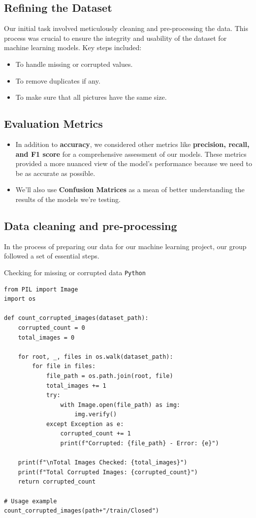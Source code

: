 \documentclass{modeleRapport}
\begin{document}
\subsection{Refining the Dataset}
Our initial task involved meticulously cleaning and pre-processing the data. This process was crucial to ensure the integrity and usability of the dataset for machine learning models. Key steps included: 
\begin{itemize}
    \item To handle missing or corrupted values.
    \item To remove duplicates if any.
    \item To make sure that all pictures have the same size.
\end{itemize}

\subsection{Evaluation Metrics}

\begin{itemize}
    \item In addition to \textbf{accuracy}, we considered other metrics like \textbf{precision, recall, and F1 score} for a comprehensive assessment of our models. These metrics provided a more nuanced view of the model's performance because we need to be as accurate as possible. 
    \item We'll also use \textbf{Confusion Matrices} as a mean of better understanding the results of the models we're testing.
\end{itemize}

\subsection{Data cleaning and pre-processing}

In the process of preparing our data for our machine learning project, our group followed a set of essential steps.

\begin{codebox}{Checking for missing or corrupted data \texttt{Python}}
\begin{lstlisting}
from PIL import Image
import os

def count_corrupted_images(dataset_path):
    corrupted_count = 0
    total_images = 0

    for root, _, files in os.walk(dataset_path):
        for file in files:
            file_path = os.path.join(root, file)
            total_images += 1
            try:
                with Image.open(file_path) as img:
                    img.verify()
            except Exception as e:
                corrupted_count += 1
                print(f"Corrupted: {file_path} - Error: {e}")

    print(f"\nTotal Images Checked: {total_images}")
    print(f"Total Corrupted Images: {corrupted_count}")
    return corrupted_count

# Usage example
count_corrupted_images(path+"/train/Closed")
\end{lstlisting}
\end{codebox}
\end{document}
